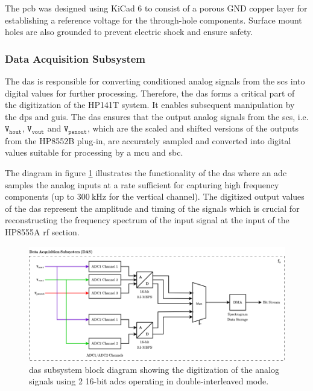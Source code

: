 \documentclass[class=report,11pt,crop=false]{standalone}
\begin{document}
	 The \acrshort{pcb} was designed using KiCad 6 to consist of a porous GND copper layer for establishing a reference voltage for the through-hole components. Surface mount holes are also grounded to prevent electric shock and ensure safety. 

	\subsubsection{Data Acquisition Subsystem}
	
	The \acrfull{das} is responsible for converting conditioned analog signals from the \acrshort{scs} into digital values for further processing. Therefore, the \acrshort{das} forms a critical part of the digitization of the HP141T system. It enables subsequent manipulation by the \acrlong{dps} and \acrshort{guis}. The \acrshort{das} ensures that the output analog signals from the \acrshort{scs}, i.e. $\texttt{V}_\texttt{hout}$, $\texttt{V}_\texttt{vout}$ and $\texttt{V}_\texttt{penout}$, which are the scaled and shifted versions of the outputs from the HP8552B plug-in, are accurately sampled and converted into digital values suitable for processing by a \acrshort{mcu} and \acrshort{sbc}. 
	
	The diagram in figure \ref{fig:das-subsystem-diagram} illustrates the functionality of the \acrshort{das} where an \acrshort{adc} samples the analog inputs at a rate sufficient for capturing high frequency components (up to $\SI{300}{\kilo\hertz}$ for the vertical channel). The digitized output values of the \acrshort{das} represent the amplitude and timing of the signals which is crucial for reconstructing the frequency spectrum of the input signal at the input of the HP8555A \acrshort{rf} section.
	
	\begin{figure}[h!]
		\centering
		\includegraphics[width=0.7\linewidth]{Figures/Methodology/das-subsystem-diagram}
		\caption{\acrshort{das} subsystem block diagram showing the digitization of the analog signals using 2 16-bit \acrshort{adc}s operating in double-interleaved mode.}
		\label{fig:das-subsystem-diagram}
	\end{figure} 
	
\end{document}
